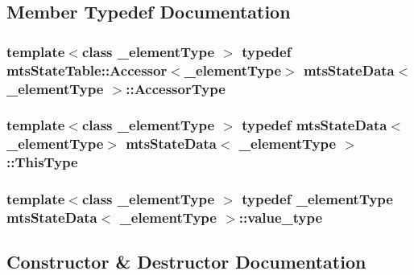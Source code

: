 \subsection{Member Typedef Documentation}
\hypertarget{classmts_state_data_a21eb9a3d0093820221159ffd63fa9616}{}
\subsubsection[{Accessor\+Type}]{\setlength{\rightskip}{0pt plus 5cm}template$<$class \+\_\+element\+Type $>$ typedef {\bf mts\+State\+Table\+::\+Accessor}$<$\+\_\+element\+Type$>$ {\bf mts\+State\+Data}$<$ \+\_\+element\+Type $>$\+::{\bf Accessor\+Type}\hspace{0.3cm}{\ttfamily [protected]}}\label{classmts_state_data_a21eb9a3d0093820221159ffd63fa9616}
\hypertarget{classmts_state_data_aaa07d52871cdcbe7388b69bbcf1b114a}{}
\subsubsection[{This\+Type}]{\setlength{\rightskip}{0pt plus 5cm}template$<$class \+\_\+element\+Type $>$ typedef {\bf mts\+State\+Data}$<$\+\_\+element\+Type$>$ {\bf mts\+State\+Data}$<$ \+\_\+element\+Type $>$\+::{\bf This\+Type}\hspace{0.3cm}{\ttfamily [protected]}}\label{classmts_state_data_aaa07d52871cdcbe7388b69bbcf1b114a}
\hypertarget{classmts_state_data_aeffdf781c6be5cac19466d4f3d25b3a3}{}
\subsubsection[{value\+\_\+type}]{\setlength{\rightskip}{0pt plus 5cm}template$<$class \+\_\+element\+Type $>$ typedef \+\_\+element\+Type {\bf mts\+State\+Data}$<$ \+\_\+element\+Type $>$\+::{\bf value\+\_\+type}\hspace{0.3cm}{\ttfamily [protected]}}\label{classmts_state_data_aeffdf781c6be5cac19466d4f3d25b3a3}


\subsection{Constructor \& Destructor Documentation}
\hypertarget{classmts_state_data_a12c7e484ccac76e8c5551b53d1a42a25}{}
